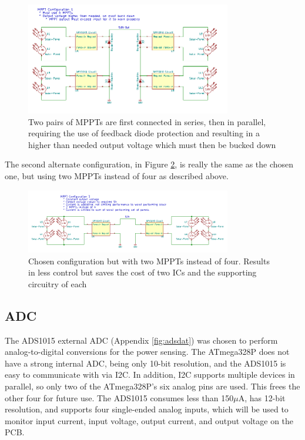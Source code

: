 \documentclass{article}
\numberwithin{figure}{section}
\numberwithin{equation}{section}
\begin{document}
{\begin{figure}[H]
  \centering
  \includegraphics[width=0.8\textwidth]{MPPTConfig1}
  \caption{Two pairs of MPPTs are first connected in series, then in parallel, requiring the use of feedback diode protection and resulting in a higher than needed output voltage which must then be bucked down}
  \label{fig:mppt_config1}
\end{figure}

The second alternate configuration, in Figure \ref{fig:mppt_config3}, is really the same as the chosen one, but using two MPPTs instead of four as described above.

\begin{figure}[H]
  \centering
  \includegraphics[width=0.8\textwidth]{MPPTConfig3}
  \caption{Chosen configuration but with two MPPTs instead of four. Results in less control but saves the cost of two ICs and the supporting circuitry of each}
  \label{fig:mppt_config3}
\end{figure}

\subsection{ADC} \label{sect:adc_just}
The ADS1015 external ADC (Appendix \ref{fig:adsdat}) was chosen to perform analog-to-digital conversions for the power sensing. The ATmega328P does not have a strong internal ADC, being only 10-bit resolution, and the ADS1015 is easy to communicate with via I2C. In addition, I2C supports multiple devices in parallel, so only two of the ATmega328P's six analog pins are used. This frees the other four for future use. The ADS1015 consumes less than 150$\mu$A, has 12-bit resolution, and supports four single-ended analog inputs, which will be used to monitor input current, input voltage, output current, and output voltage on the PCB.

}
\end{document}
